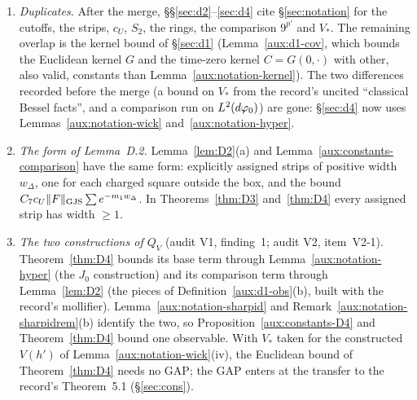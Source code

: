 \begin{enumerate}
$K_{e_j}=0$).
\item[(C5)] \emph{Duplicates.}  After the merge, \S\S\ref{sec:d2}--\ref{sec:d4} cite
\S\ref{sec:notation} for the cutoffs, the strips, $c_U$, $S_2$, the rings, the comparison
$9^{p'}$ and $V_*$.  The remaining overlap is the kernel bound of \S\ref{sec:d1}
(Lemma~\ref{aux:d1-cov}, which bounds the Euclidean kernel $G$ and the time-zero kernel
$C=G(0,\cdot)$ with other, also valid, constants than Lemma~\ref{aux:notation-kernel}).  The two
differences recorded before the merge (a bound on $V_*$ from the record's uncited ``classical
Bessel facts'', and a comparison run on $L^2(d\varphi_0)$) are gone: \S\ref{sec:d4} now uses
Lemmas~\ref{aux:notation-wick} and~\ref{aux:notation-hyper}.
\item[(C6)] \emph{The form of Lemma~D.2.}  Lemma~\ref{lem:D2}(a) and
Lemma~\ref{aux:constants-comparison} have the same form: explicitly assigned strips of positive
width $w_\Delta$, one for each charged square outside the box, and the bound
$C_7c_U\lVert F\rVert_{\mathrm{GJS}}\sum e^{-m_1w_\Delta}$.  In Theorems~\ref{thm:D3} and~\ref{thm:D4} every assigned
strip has width $\ge1$.
\item[(C7)] \emph{The two constructions of $Q_V$} (audit V1, finding~1; audit V2, item~V2-1).
Theorem~\ref{thm:D4} bounds its base term through Lemma~\ref{aux:notation-hyper} (the $J_0$
construction) and its comparison term through Lemma~\ref{lem:D2} (the pieces of
Definition~\ref{aux:d1-obs}(b), built with the record's mollifier).
Lemma~\ref{aux:notation-sharpid} and Remark~\ref{aux:notation-sharpidrem}(b) identify the two, so
Proposition~\ref{aux:constants-D4} and Theorem~\ref{thm:D4} bound one observable.  With $V_*$
taken for the constructed $V(h')$ of Lemma~\ref{aux:notation-wick}(iv), the Euclidean bound of
Theorem~\ref{thm:D4} needs no GAP; the GAP enters at the transfer to the record's Theorem~5.1
(\S\ref{sec:cons}).
\end{enumerate}
